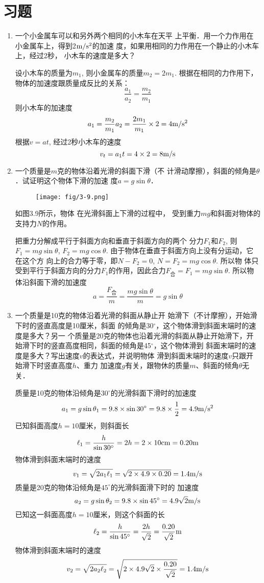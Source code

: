 \section{习题}
\begin{enumerate}
    \item 一个小金属车可以和另外两个相同的小木车在天平
上平衡．用一个力作用在小金属车上，得到2$\text{m}/\text{s}^2$的加速
度，如果用相同的力作用在一个静止的小木车上，经过2秒，
小木车的速度是多大？

\begin{solution}
    设小木车的质量为$m_1$, 则小金属车的质量$m_2=2m_1$.
根据在相同的力作用下，物体的加速度跟质量成反比的关系：
\[\frac{a_1}{a_2}=\frac{m_2}{m_1}\]
则小木车的加速度
\[a_1=\frac{m_2}{m_1}a_2=\frac{2m_1}{m_1}\times 2=4\text{m}/\text{s}^2\]
根据$v=at$, 经过2秒小木车的速度
\[v_t=a_1t=4\times2=8\text{m}/\text{s}\]
\end{solution}
\item  一个质量是$m$克的物体沿着光滑的斜面下滑（不
计滑动摩擦），斜面的倾角是$\theta$．试证明这个物体下滑的加速
度$a=g\sin\theta$．

\begin{figure}[htp]
    \centering
\texttt{[image: fig/3-9.png]}
    \caption{}
\end{figure}

\begin{solution}
如图3.9所示，物体
在光滑斜面上下滑的过程中，
受到重力$mg$和斜面对物体的
支持力$N$的作用。

把重力分解成平行于斜面方向和垂直于斜面方向的两个
分力$F_1$和$F_2$, 则$F_1=mg\sin\theta$, $F_2=mg\cos\theta$.
由于物体在垂直于斜面方向上没有分运动，它在这个方
向上的合力等于零，即$N-F_2=0$, $N=F_2=mg\cos\theta$. 所以物
体只受到平行于斜面方向的分力$F_1$的作用，因此合力$F_{\text{合}}=F_1=mg\sin\theta$. 所以物体沿斜面下滑的加速度
\[a=\frac{F_{\text{合}}}{m}=\frac{mg\sin\theta}{m}=g\sin\theta\]
\end{solution}
\item  一个质量是10克的物体沿着光滑的斜面从静止开
始滑下（不计摩擦），开始滑下时的竖直高度是10厘米，斜面
的倾角是30$^\circ$，这个物体滑到斜面末端时的速度是多大？另一
个质量是20克的物体也沿着光滑的斜面从静止开始滑下，开
始滑下时的竖直高度相同，斜面的倾角是45$^\circ$，这个物体滑到
斜面末端时的速度是多大？写出速度$v$的表达式，并说明物体
滑到斜面末端时的速度$v$只跟开始滑下时竖直高度$h$、重力
加速度$g$有关，跟物休的质量$m$、斜面的倾角$\theta$无关．

\begin{solution}
    质量是10克的物体沿倾角是30$^\circ$的光滑斜面下滑时的加速度
\[a_1=g\sin\theta_1=9.8\times \sin 30^\circ=9.8\times \frac{1}{2}=4.9\text{m}/\text{s}^2\]
已知斜面高度$h=10$厘米，则斜面长
\[\ell_1=\frac{h}{\sin 30^{\circ}}=2h=2\times 10{\rm cm}=0.20{\rm m}\]
物体滑到斜面末端时的速度
\[v_1=\sqrt{2a_1\ell_1}=\sqrt{2\times4.9\times0.20}=1.4\text{m}/\text{s}\]
质量是20克的物体沿倾角是$45^{\circ}$的光滑斜面滑下时的
加速度
\[a_2=g\sin\theta_2=9.8\times\sin45^{\circ}=4.9\sqrt{2}\text{m}/\text{s}\]
已知这一斜面高度$h=10$厘米，则这个斜面的长
\[\ell_2=\frac{h}{\sin 45^{\circ}}=\frac{2h}{\sqrt{2}}=\frac{0.20}{\sqrt{2}}{\rm m}\]
物体滑到斜面末端时的速度
\[v_2=\sqrt{2a_2\ell_2}=\sqrt{2\times4.9\sqrt{2}\times\frac{0.20}{\sqrt{2}}}=1.4\text{m}/\text{s}\]


\end{solution}
\end{enumerate}
